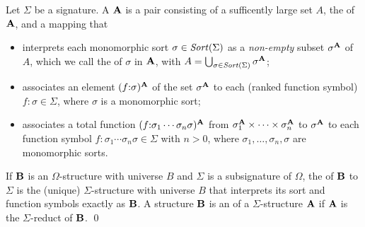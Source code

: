 
\begin{definition}
Let $\Sigma$ be a signature.
A  $\mathbf{A}$ is a pair consisting of 
a sufficently large set $A$,  the  of $\mathbf{A}$, and 
a mapping that

\begin{itemize}
\item interprets
each monomorphic sort $\sigma \in \mathit{Sort}(\Sigma)$ as a \emph{non-empty} subset $\sigma^{\mathbf{A}}$ of $A$,
which we call the  of $\sigma$ in $\mathbf{A}$,
with $A = \bigcup_{\sigma \in \mathit{Sort}(\Sigma)} \sigma^{\mathbf{A}}$;

\item associates
an element $(f{:}\sigma)^{\mathbf{A}}$ of the set $\sigma^{\mathbf{A}}$ to
each (ranked function symbol) $f{:}\sigma \in \Sigma$,
where $\sigma$ is a monomorphic sort;

\item associates
a total function 
$(f{:}\sigma_1\cdots\sigma_n\sigma)^{\mathbf{A}}$ 
from $\sigma_1^{\mathbf{A}} \times \cdots \times \sigma_n^{\mathbf{A}}$ to
$\sigma^{\mathbf{A}}$ to each function symbol $f{:}\sigma_1\cdots\sigma_n\sigma \in \Sigma$ with $n > 0$,
where $\sigma_1, \ldots, \sigma_n, \sigma$ are monomorphic sorts.
\end{itemize}

If $\mathbf{B}$ is an $\Omega$-structure with universe $B$ and 
$\Sigma$ is a subsignature of $\Omega$,
the  of $\mathbf{B}$ to $\Sigma$ is the (unique) 
$\Sigma$-structure with universe $B$
that interprets its sort and function symbols exactly as $\mathbf{B}$.
A structure $\mathbf{B}$ is an  of a $\Sigma$-structure $\mathbf{A}$
if $\mathbf{A}$ is the $\Sigma$-reduct of $\mathbf{B}$.
\qed
\end{definition}

